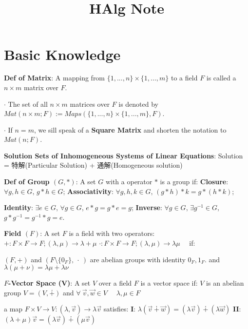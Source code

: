 \documentclass[9pt]{article}
\title{HAlg Note}
\author{}
\date{}
\begin{document}
\maketitle
\thispagestyle{fancy}
\vspace{-3.5cm}

\fontsize{10pt}{11pt}\selectfont
\setlength{\parindent}{8pt}


\section{Basic Knowledge} %

\textbf{Def of Matrix}: A mapping from $\{1,...,n\}\times\{1,...,m\}$ to a field $F$ is called a $n\times m$ matrix over $F$.

$\cdot$ The set of all $n\times m$ matrices over $F$ is denoted by $Mat(n\times m;F):=Maps(\{1,...,n\}\times\{1,...,m\},F)$.

$\cdot$ If $n=m$, we sill speak of a \textbf{Square Matrix} and shorten the notation to $Mat(n;F)$.

\textbf{Solution Sets of Inhomogeneous Systems of Linear Equations}: {\small Solution = 特解(Particular Solution) + 通解(Homogeneous solution)}

\textbf{Def of Group $(G,*)$}: A set $G$ with a operator $*$ is a group if: {\small \textbf{Closure}: $\forall g,h\in G$, $g*h\in G$; \textbf{Associativity}: $\forall g,h,k\in G$, $(g*h)*k=g*(h*k)$;}

\hspace{85pt} {\small \textbf{Identity}: $\exists e\in G$, $\forall g\in G$, $e*g=g*e=g$; \textbf{Inverse}: $\forall g\in G$, $\exists g^{-1}\in G$, $g*g^{-1}=g^{-1}*g=e$.}

\textbf{Field $(F)$}: A set $F$ is a field with two operators: $+:F\times F\to F;(\lambda,\mu)\to\lambda+\mu$ $\cdot:F\times F\to F;(\lambda,\mu)\to\lambda\mu$ \ \ if:

\quad \quad \quad \quad $(F,+)$ and $(F\setminus\{0_F\}, \ \cdot \ )$ are abelian groups with identity $0_F,1_F$. \quad and \quad $\lambda(\mu+\nu)=\lambda\mu+\lambda\nu$

\textbf{$F$-Vector Space (V)}: A set $V$ over a field $F$ is a vector space if: \quad $V$ is an abelian group $V=(V,\dotplus)$ and $\forall \ \vec{v},\vec{w}\in V$ \ \ $\lambda,\mu\in F$

\quad \quad \quad \quad a map $F\times V\to V:(\lambda,\vec{v})\to\lambda\vec{v}$ satisfies: \textbf{I}: $\lambda(\vec{v}\dotplus\vec{w})=(\lambda\vec{v})\dotplus(\lambda\vec{w})$ \quad \textbf{II}: $(\lambda+\mu)\vec{v}=(\lambda\vec{v})\dotplus(\mu\vec{v})$
\end{document}
